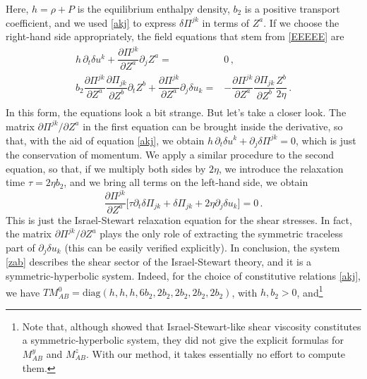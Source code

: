 \documentclass[a4paper, amsfonts, amssymb, amsmath, reprint, showkeys, nofootinbib, twoside, onecolumn,notitlepage]{revtex4-1}
\begin{document}
Here, $h=\rho+P$ is the equilibrium enthalpy density, $b_2$ is a positive transport coefficient, and we used \eqref{akj} to express $\delta \Pi^{jk}$ in terms of $Z^a$. If we choose the right-hand side appropriately, the field equations that stem from \eqref{EEEEE} are
\begin{equation}\label{zab}
\begin{split}
 h \, \partial_t \delta u^k +\dfrac{\partial \Pi^{jk}}{\partial Z^a} \partial_j Z^a = {} & 0 \, ,\\
b_2 \dfrac{\partial \Pi^{jk}}{\partial Z^a} \dfrac{\partial \Pi_{jk}}{\partial Z^b} \partial_t Z^b +  \dfrac{\partial \Pi^{jk}}{\partial Z^a} \partial_j \delta u_k = {}& - \dfrac{\partial \Pi^{jk}}{\partial Z^a} \dfrac{\partial \Pi_{jk}}{\partial Z^b} \dfrac{Z^b}{2\eta} \, . \\
\end{split}
\end{equation} 
In this form, the equations look a bit strange. But let's take a closer look. The matrix $\partial \Pi^{jk}/\partial Z^a$ in the first equation can be brought inside the derivative, so that, with the aid of equation \eqref{akj}, we obtain $ h \, \partial_t \delta u^k +\partial_j \delta \Pi^{jk}=0$, which is just the conservation of momentum. We apply a similar procedure to the second equation, so that, if we multiply both sides by $2\eta$, we introduce the relaxation time $\tau=2\eta b_2$, and we bring all terms on the left-hand side, we obtain
\begin{equation}
 \dfrac{\partial \Pi^{jk}}{\partial Z^a} \bigg[ \tau \partial_t \delta \Pi_{jk} + \delta \Pi_{jk} + 2\eta \partial_j \delta u_k \bigg]=0 \, .
\end{equation}
This is just the Israel-Stewart relaxation equation for the shear stresses. In fact, the matrix $\partial \Pi^{jk}/\partial Z^a$ plays the only role of extracting the symmetric traceless part of $\partial_j \delta u_k$ (this can be easily verified explicitly). In conclusion, the system \eqref{zab} describes the shear sector of the Israel-Stewart theory, and it is a symmetric-hyperbolic system. Indeed, for the choice of constitutive relations \eqref{akj}, we have $TM^0_{AB}=\text{diag}(h,h,h,6b_2,2b_2,2b_2,2b_2,2b_2)$, with $h,b_2>0$, and\footnote{Note that, although \citet{Hishcock1983} showed that Israel-Stewart-like shear viscosity constitutes a symmetric-hyperbolic system, they did not give the explicit formulas for $M^y_{AB}$ and $M^z_{AB}$. With our method, it takes essentially no effort to compute them.}
\end{document}
